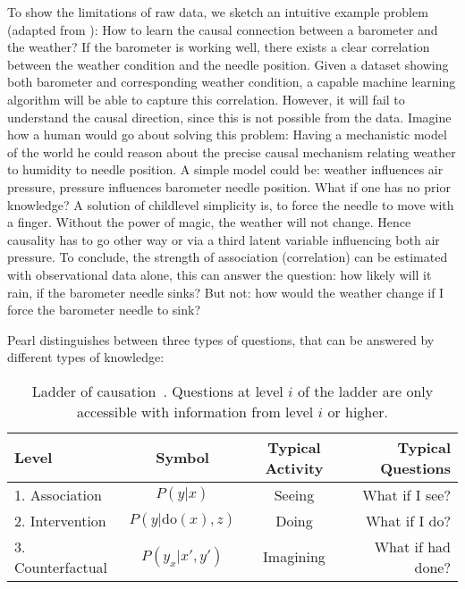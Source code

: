 		To show the limitations of raw data, we sketch an intuitive example problem (adapted from \cite{pearl18why}):
		How to learn the causal connection between a barometer and the weather? If the barometer is working well, there exists a clear correlation between the weather condition and the needle position. Given a dataset showing both barometer and corresponding weather condition, a capable machine learning algorithm will be able to capture this correlation. However, it will fail to understand the causal direction, since this is not possible from the data.
		Imagine how a human would go about solving this problem:
		Having a mechanistic model of the world he could reason about the precise causal mechanism relating weather to humidity to needle position. A simple model could be: weather influences air pressure, pressure influences barometer needle position.
		What if one has no prior knowledge? A solution of childlevel simplicity is, to force the needle to move with a finger. Without the power of magic, the weather will not change. Hence causality has to go other way or via a third latent variable influencing both \ie air pressure.
		To conclude, the strength of association (correlation) can be estimated with observational data alone, this can answer the question: how likely will it rain, if the barometer needle sinks? But not: how would the weather change if I force the barometer needle to sink?

		Pearl \cite{pearl18why} distinguishes between three types of questions, that can be answered by different types of knowledge:
		\begin{table}[htp]
			\centering
			\caption{Ladder of causation~\cite{pearl18impediments}. Questions at level $i$ of the ladder are only accessible with information from level $i$ or higher.}
			\label{tab:overview}
			\begin{tabular}{l|ccr}
				\hline
				Level & Symbol & Typical Activity & Typical Questions \\ \hline
				1. Association & $P(y|x)$ & Seeing & What if I see?  \\
				2. Intervention& $P(y|\mathrm{do}(x), z)$ & Doing& What if I do?  \\
				3. Counterfactual& $P(y_x|x', y')$ & Imagining & What if had done?  \\ \hline
			\end{tabular}
		\end{table}


